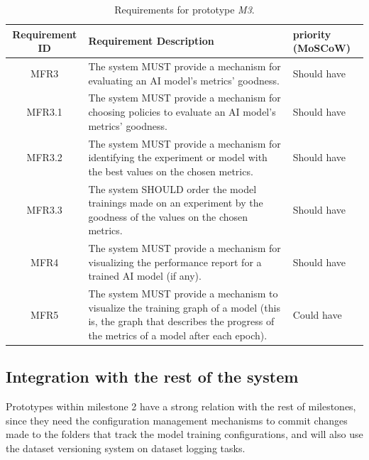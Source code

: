 \begin{table}[H]
    \centering
    \begin{tabular}{ | c | p{9cm} | p{3cm} |}
        \hline
        \textbf{Requirement ID} & \textbf{Requirement Description} & \textbf{priority (MoSCoW)} \\ \hline
        MFR3     & The system MUST provide a mechanism for evaluating an AI model's metrics' goodness. & Should have \\ \hline
        MFR3.1   & The system MUST provide a mechanism for choosing policies to evaluate an AI model's metrics' goodness. & Should have \\ \hline
        MFR3.2   & The system MUST provide a mechanism for identifying the experiment or model with the best values on the chosen metrics. & Should have \\ \hline
        MFR3.3   & The system SHOULD order the model trainings made on an experiment by the goodness of the values on the chosen metrics. & Should have \\ \hline
        MFR4     & The system MUST provide a mechanism for visualizing the performance report for a trained AI model (if any). & Should have \\ \hline
        MFR5     & The system MUST provide a mechanism to visualize the training graph of a model (this is, the graph that describes the progress of the metrics of a model after each epoch). & Could have \\ \hline
    \end{tabular}
    \caption{Requirements for prototype \emph{M3}.}
    \label{tab:requirementsM3}
\end{table}

\subsection{Integration with the rest of the system}

Prototypes within milestone 2 have a strong relation with the rest of milestones, since they need the configuration management mechanisms to commit changes made to the folders that track
the model training configurations, and will also use the dataset versioning system on dataset logging tasks.

